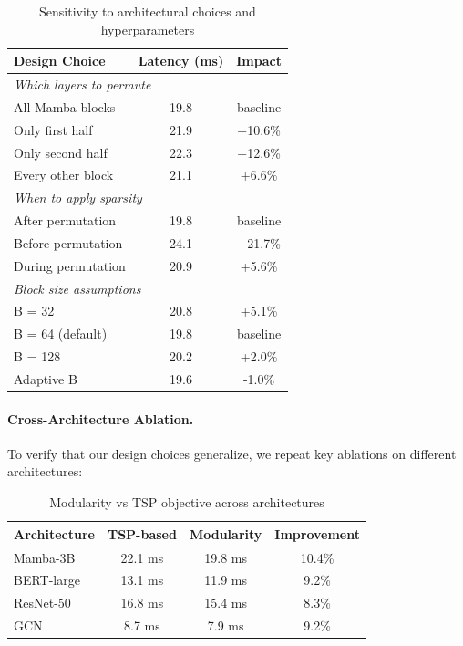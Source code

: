 \documentclass{article}
\begin{document}
\begin{table}[h]
\caption{Sensitivity to architectural choices and hyperparameters}
\label{tab:sensitivity}
\centering
\begin{tabular}{lcc}
\toprule
\textbf{Design Choice} & \textbf{Latency (ms)} & \textbf{Impact} \\
\midrule
\multicolumn{3}{l}{\textit{Which layers to permute}} \\
All Mamba blocks & 19.8 & baseline \\
Only first half & 21.9 & +10.6\% \\
Only second half & 22.3 & +12.6\% \\
Every other block & 21.1 & +6.6\% \\
\midrule
\multicolumn{3}{l}{\textit{When to apply sparsity}} \\
After permutation & 19.8 & baseline \\
Before permutation & 24.1 & +21.7\% \\
During permutation & 20.9 & +5.6\% \\
\midrule
\multicolumn{3}{l}{\textit{Block size assumptions}} \\
B = 32 & 20.8 & +5.1\% \\
B = 64 (default) & 19.8 & baseline \\
B = 128 & 20.2 & +2.0\% \\
Adaptive B & 19.6 & -1.0\% \\
\bottomrule
\end{tabular}
\end{table}

\paragraph{Cross-Architecture Ablation.}
To verify that our design choices generalize, we repeat key ablations 
on different architectures:

\begin{table}[h]
\caption{Modularity vs TSP objective across architectures}
\centering
\begin{tabular}{lccc}
\toprule
\textbf{Architecture} & \textbf{TSP-based} & \textbf{Modularity} & \textbf{Improvement} \\
\midrule
Mamba-3B & 22.1 ms & 19.8 ms & 10.4\% \\
BERT-large & 13.1 ms & 11.9 ms & 9.2\% \\
ResNet-50 & 16.8 ms & 15.4 ms & 8.3\% \\
GCN & 8.7 ms & 7.9 ms & 9.2\% \\
\bottomrule
\end{tabular}
\end{table}
\end{document}
